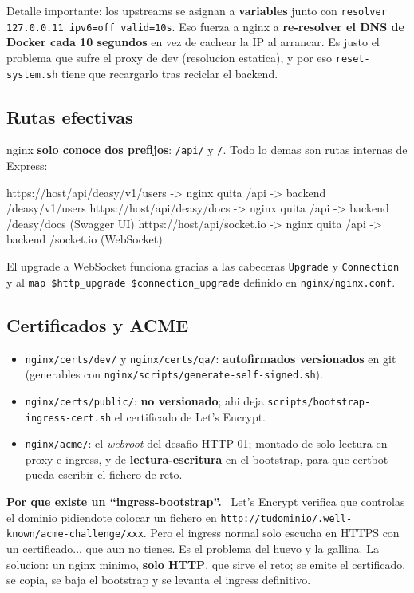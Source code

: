 \documentclass[11pt,a4paper,oneside]{report}
\newenvironment{concepto}[1][Concepto para juniors]{%
  \par\medskip
  \colorlet{shadecolor}{blue!7}%
  \begin{shaded}\noindent\textbf{\color{blue!55!black}#1.}\ \ignorespaces}%
  {\end{shaded}\par\medskip}
\newcommand{\rt}[1]{\texttt{#1}}
\begin{document}
Detalle importante: los upstreams se asignan a \textbf{variables} junto con
\rt{resolver 127.0.0.11 ipv6=off valid=10s}. Eso fuerza a nginx a \textbf{re-resolver el DNS de
Docker cada 10 segundos} en vez de cachear la IP al arrancar. Es justo el problema que sufre el
proxy de dev (resolucion estatica), y por eso \rt{reset-system.sh} tiene que recargarlo tras
reciclar el backend.

\subsection{Rutas efectivas}

nginx \textbf{solo conoce dos prefijos}: \rt{/api/} y \rt{/}. Todo lo demas son rutas internas
de Express:

\begin{diagrama}
https://host/api/deasy/v1/users   ->  nginx quita /api  ->  backend /deasy/v1/users
https://host/api/deasy/docs       ->  nginx quita /api  ->  backend /deasy/docs   (Swagger UI)
https://host/api/socket.io        ->  nginx quita /api  ->  backend /socket.io    (WebSocket)
\end{diagrama}

El upgrade a WebSocket funciona gracias a las cabeceras \rt{Upgrade} y \rt{Connection} y al
\rt{map \$http\_upgrade \$connection\_upgrade} definido en \rt{nginx/nginx.conf}.

\subsection{Certificados y ACME}

\begin{itemize}[leftmargin=1.4em]
  \item \rt{nginx/certs/dev/} y \rt{nginx/certs/qa/}: \textbf{autofirmados versionados} en git
        (generables con \rt{nginx/scripts/generate-self-signed.sh}).
  \item \rt{nginx/certs/public/}: \textbf{no versionado}; ahi deja
        \rt{scripts/bootstrap-ingress-cert.sh} el certificado de Let's Encrypt.
  \item \rt{nginx/acme/}: el \emph{webroot} del desafio HTTP-01; montado de solo lectura en
        proxy e ingress, y de \textbf{lectura-escritura} en el bootstrap, para que certbot pueda
        escribir el fichero de reto.
\end{itemize}

\begin{concepto}[Por que existe un ``ingress-bootstrap'']
Let's Encrypt verifica que controlas el dominio pidiendote colocar un fichero en
\rt{http://tudominio/.well-known/acme-challenge/xxx}. Pero el ingress normal solo escucha en
HTTPS con un certificado... que aun no tienes. Es el problema del huevo y la gallina. La
solucion: un nginx minimo, \textbf{solo HTTP}, que sirve el reto; se emite el certificado, se
copia, se baja el bootstrap y se levanta el ingress definitivo.
\end{concepto}
\end{document}
